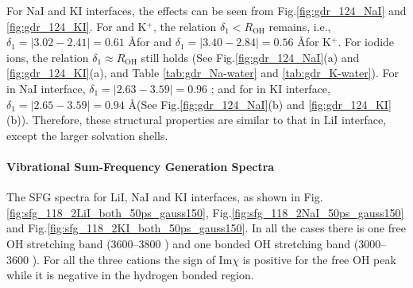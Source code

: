 For NaI and KI interfaces, the effects can be seen from Fig.\space\ref{fig:gdr_124_NaI} and \ref{fig:gdr_124_KI}. For \Na and K$^+$, 
the relation $\delta_1 < R_{\text{OH}}$ remains,
i.e., $\delta_1 = |3.02 - 2.41| = 0.61$ \AA for \Na and $\delta_1 = |3.40 - 2.84| = 0.56$ \AA  for K$^+$.
For iodide ions, the relation $\delta_1 \approx R_{\text{OH}}$ still holds (See Fig.\space\ref{fig:gdr_124_NaI}(a) and \ref{fig:gdr_124_KI}(a),
and Table \ref{tab:gdr_Na-water} and \ref{tab:gdr_K-water}). For \I in NaI interface, $\delta_1 = |2.63 - 3.59| = 0.96$ \A; 
and for \I in KI interface, $\delta_1 = |2.65 - 3.59| = 0.94$ \AA (See Fig.\space\ref{fig:gdr_124_NaI}(b) and \ref{fig:gdr_124_KI}(b)).
Therefore, these structural properties are similar to that in LiI interface, except the larger solvation shells.

\paragraph{Vibrational Sum-Frequency Generation Spectra}
The SFG spectra for LiI, NaI and KI interfaces, as shown in Fig.\space\ref{fig:sfg_118_2LiI_both_50ps_gauss150}, Fig.\space\ref{fig:sfg_118_2NaI_50ps_gauss150} and 
Fig.\space\ref{fig:sfg_118_2KI_both_50ps_gauss150}. In all the cases there is one free OH stretching band (3600--3800 \centimeter) and 
one bonded OH stretching band (3000--3600 \centimeter).
For all the three cations the sign of Im$\chi$ is positive for the free OH peak while it is negative in the hydrogen bonded region. %
